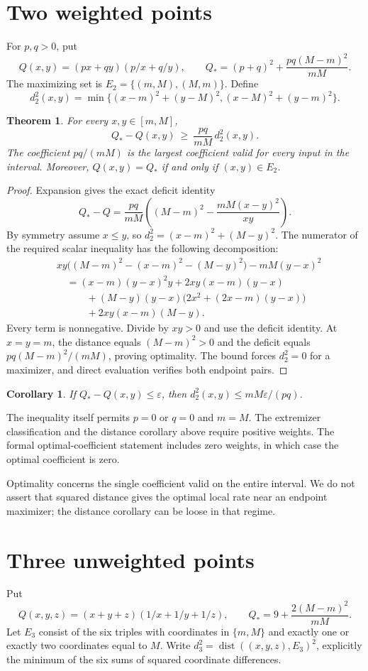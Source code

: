 \documentclass[11pt]{article}
\newtheorem{theorem}{Theorem}
\newtheorem{corollary}{Corollary}
\newcommand{\dist}{\operatorname{dist}}
\begin{document}
\section{Two weighted points}
For $p,q>0$, put
\[
 Q(x,y)=(px+qy)(p/x+q/y),\qquad
 Q_*=(p+q)^2+\frac{pq(M-m)^2}{mM}.
\]
The maximizing set is $E_2=\{(m,M),(M,m)\}$. Define
\[
 d_2^2(x,y)=\min\{(x-m)^2+(y-M)^2,
                         (x-M)^2+(y-m)^2\}.
\]
\begin{theorem}\label{thm:two}
For every $x,y\in[m,M]$,
\[
 Q_*-Q(x,y)\ \ge\ \frac{pq}{mM}\,d_2^2(x,y).
\]
The coefficient $pq/(mM)$ is the largest coefficient valid for every
input in the interval. Moreover, $Q(x,y)=Q_*$ if and only if
$(x,y)\in E_2$.
\end{theorem}
\begin{proof}
Expansion gives the exact deficit identity
\[
 Q_*-Q=\frac{pq}{mM}
 \left((M-m)^2-\frac{mM(x-y)^2}{xy}\right).
\]
By symmetry assume $x\le y$, so
$d_2^2=(x-m)^2+(M-y)^2$. The numerator of the required scalar inequality
has the following decomposition:
\begin{align*}
 &xy\big((M-m)^2-(x-m)^2-(M-y)^2\big)-mM(y-x)^2\\
 &\quad=(x-m)(y-x)^2y+2xy(x-m)(y-x)\\
 &\qquad\quad+(M-y)(y-x)\big(2x^2+(2x-m)(y-x)\big)\\
 &\qquad\quad+2xy(x-m)(M-y).
\end{align*}
Every term is nonnegative. Divide by $xy>0$ and use the deficit identity.
At $x=y=m$, the distance equals $(M-m)^2>0$ and the deficit equals
$pq(M-m)^2/(mM)$, proving optimality. The bound forces $d_2^2=0$ for a
maximizer, and direct evaluation verifies both endpoint pairs.
\end{proof}

\begin{corollary}
If $Q_*-Q(x,y)\le\varepsilon$, then
$d_2^2(x,y)\le mM\varepsilon/(pq)$.
\end{corollary}
The inequality itself permits $p=0$ or $q=0$ and $m=M$. The extremizer
classification and the distance corollary above require positive weights.
The formal optimal-coefficient statement includes zero weights, in which
case the optimal coefficient is zero.

Optimality concerns the single coefficient valid on the entire interval.
We do not assert that squared distance gives the optimal local rate near an
endpoint maximizer; the distance corollary can be loose in that regime.

\section{Three unweighted points}
Put
\[
 Q(x,y,z)=(x+y+z)(1/x+1/y+1/z),\qquad
 Q_*=9+\frac{2(M-m)^2}{mM}.
\]
Let $E_3$ consist of the six triples with coordinates in $\{m,M\}$ and
exactly one or exactly two coordinates equal to $M$. Write
$d_3^2=\dist((x,y,z),E_3)^2$, explicitly the minimum of the six sums of
squared coordinate differences.
\end{document}
